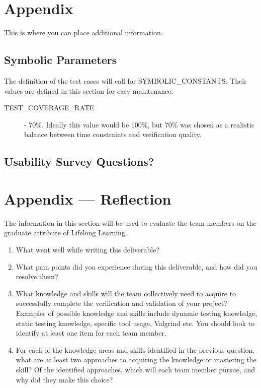 \documentclass[12pt, titlepage]{article}
\begin{document}




\newpage

\section{Appendix}

This is where you can place additional information.

\subsection{Symbolic Parameters}

The definition of the test cases will call for SYMBOLIC\_CONSTANTS.
Their values are defined in this section for easy maintenance.\\

\begin{description}
  \item[TEST\_COVERAGE\_RATE] - 70\%. Ideally this value would be 100\%, but 70\% was chosen as a realistic balance between time constraints and verification quality.
\end{description}

\subsection{Usability Survey Questions?}


\newpage{}
\section*{Appendix --- Reflection}


The information in this section will be used to evaluate the team members on the
graduate attribute of Lifelong Learning.



\begin{enumerate}
  \item What went well while writing this deliverable?
  \item What pain points did you experience during this deliverable, and how
    did you resolve them?
  \item What knowledge and skills will the team collectively need to acquire to
  successfully complete the verification and validation of your project?
  Examples of possible knowledge and skills include dynamic testing knowledge,
  static testing knowledge, specific tool usage, Valgrind etc.  You should look to
  identify at least one item for each team member.
  \item For each of the knowledge areas and skills identified in the previous
  question, what are at least two approaches to acquiring the knowledge or
  mastering the skill?  Of the identified approaches, which will each team
  member pursue, and why did they make this choice?
\end{enumerate}
\end{document}
